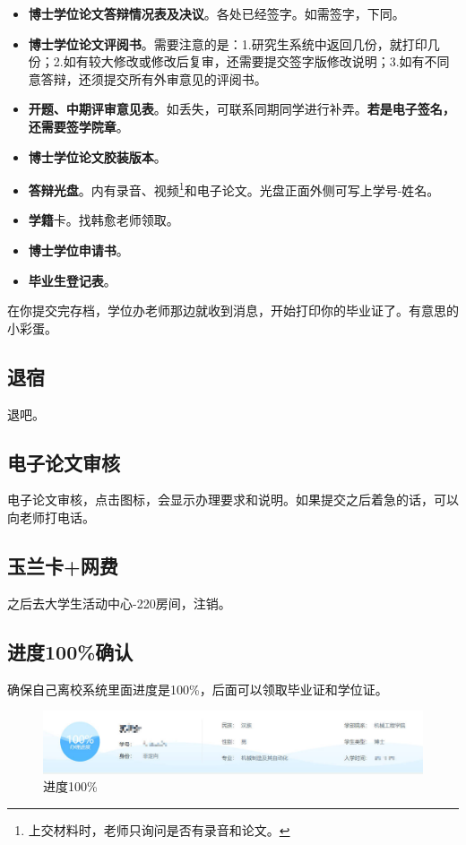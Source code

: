 \documentclass[12pt,a4paper]{ctexart}
\begin{document}
\begin{itemize}[label=〇]
\item \textbf{博士学位论文答辩情况表及决议}。各处已经签字。如需签字，下同。
\item \textbf{博士学位论文评阅书}。需要注意的是：1.研究生系统中返回几份，就打印几份；2.如有较大修改或修改后复审，还需要提交签字版修改说明；3.如有不同意答辩，还须提交所有外审意见的评阅书。
\item \textbf{开题、中期评审意见表}。如丢失，可联系同期同学进行补弄。\textbf{若是电子签名，还需要签学院章}。
\item \textbf{博士学位论文胶装版本}。
\item \textbf{答辩光盘}。内有录音、视频\footnote{上交材料时，老师只询问是否有录音和论文。}和电子论文。光盘正面外侧可写上学号-姓名。
\item \textbf{学籍}卡。找韩愈老师领取。
\item \textbf{博士学位申请书}。
  \item \textbf{毕业生登记表}。
  \end{itemize}

  在你提交完存档，学位办老师那边就收到消息，开始打印你的毕业证了。有意思的小彩蛋。
  \subsection{退宿}
\label{sec:tuisu}

退吧。

\subsection{电子论文审核}
\label{sec:Epaper}

电子论文审核，点击图标，会显示办理要求和说明。如果提交之后着急的话，可以向老师打电话。

 \subsection{玉兰卡+网费}
\label{sec:yulan}

之后去大学生活动中心-220房间，注销。

\subsection{进度100\%确认}
\label{sec:jindu100}

确保自己离校系统里面进度是100\%，后面可以领取毕业证和学位证。
  \begin{figure}[H]
    \centering
    \includegraphics[width=1.0\textwidth]{images/jindu.jpg}  %
    \caption{进度100\%}
    \label{fig:jindu}
  \end{figure}
\end{document}
